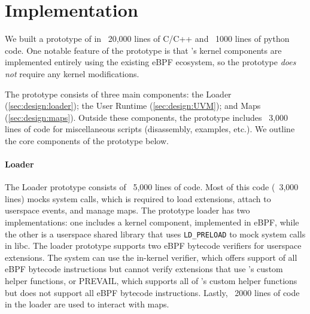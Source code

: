 \section{\sys Implementation}\label{sec:implementation}
We built a prototype of \sys{} in ~20,000 lines of C/C++ and ~1000 lines of python code.  One notable feature of the prototype is that \sys's kernel components are implemented entirely using the existing eBPF ecosystem, so the prototype \emph{does not} require any kernel modifications.  

The prototype consists of three main components: the \sys{} Loader (\cref{sec:design:loader}); the \sys{} User Runtime (\cref{sec:design:UVM}); and \sys{} Maps (\cref{sec:design:maps}).  Outside these components, the prototype includes ~3,000 lines of code for miscellaneous scripts (disassembly, examples, etc.).  We outline the core components of the prototype below.

\paragraph{\sys{} Loader}
The \sys{} Loader prototype consists of ~5,000 lines of code.  Most of this code (~3,000 lines) mocks system calls, which is required to load extensions, attach to userspace events, and manage \sys{} maps.  The prototype loader has two implementations: one includes a kernel component, implemented in eBPF, while the other is a userspace shared library that uses \texttt{LD\_PRELOAD} to mock system calls in libc.  The \sys{} loader prototype supports two eBPF bytecode verifiers for userspace extensions.  The system can use the in-kernel verifier, which offers support of all eBPF bytecode instructions but cannot verify extensions that use \sys{}'s custom helper functions, or PREVAIL, which supports all of \sys's custom helper functions but does not support all eBPF bytecode instructions.  Lastly, ~2000 lines of code in the loader are used to interact with \sys{} maps.




